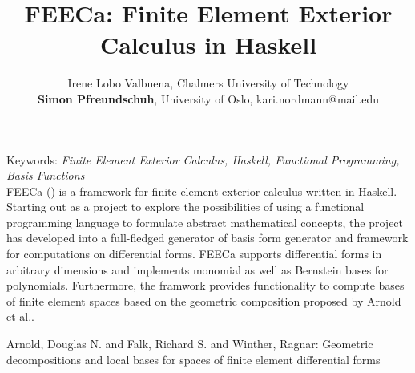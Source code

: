 \documentclass[11pt,a4paper]{article}
\begin{document}
\thispagestyle{empty}

\title{FEECa: Finite Element Exterior Calculus in Haskell}

\author{Irene Lobo Valbuena, Chalmers University of Technology \\
        \textbf{Simon Pfreundschuh}, University of Oslo, kari.nordmann@mail.edu}

\date{} %
\maketitle\thispagestyle{empty}

Keywords: \emph{Finite Element Exterior Calculus, Haskell, Functional Programming,
  Basis Functions}\\


FEECa (\textipa{["fi:ka]}) is a framework for finite element exterior
calculus written in Haskell. Starting out as a project to explore the
possibilities of using a functional programming language to formulate
abstract mathematical concepts, the project has developed into a
full-fledged generator of basis form generator and framework for
computations on differential forms. FEECa supports differential forms
in arbitrary dimensions and implements monomial as well as Bernstein bases
for polynomials. Furthermore, the framwork  provides functionality to
compute bases of finite element spaces based on the geometric composition
proposed by Arnold et al.\cite{arnold}.

\begin{thebibliography}{00}
Arnold, Douglas N. and Falk, Richard S. and Winther, Ragnar:
 Geometric decompositions and local bases for spaces of finite element differential forms
\end{thebibliography}
\end{document}
